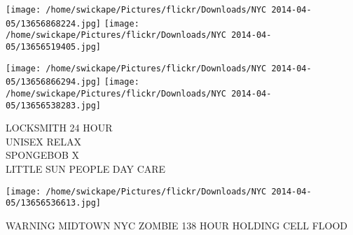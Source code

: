 \documentclass[10pt,letterpaper]{article}
\begin{document}
\texttt{[image: /home/swickape/Pictures/flickr/Downloads/NYC 2014-04-05/13656868224.jpg]}
\texttt{[image: /home/swickape/Pictures/flickr/Downloads/NYC 2014-04-05/13656519405.jpg]}

\texttt{[image: /home/swickape/Pictures/flickr/Downloads/NYC 2014-04-05/13656866294.jpg]}
\texttt{[image: /home/swickape/Pictures/flickr/Downloads/NYC 2014-04-05/13656538283.jpg]}

LOCKSMITH 24 HOUR\\
UNISEX RELAX\\
SPONGEBOB X\\
LITTLE SUN PEOPLE DAY CARE\\
\pagebreak

\texttt{[image: /home/swickape/Pictures/flickr/Downloads/NYC 2014-04-05/13656536613.jpg]}

WARNING MIDTOWN NYC ZOMBIE 138 HOUR HOLDING CELL FLOOD\\
\pagebreak
\end{document}
